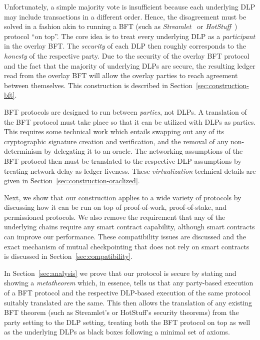 Unfortunately, a simple majority vote is insufficient because each
underlying DLP may include transactions in a different order. Hence,
the disagreement must be solved in a fashion akin to running a BFT
(such as \emph{Streamlet}~\cite{streamlet} or \emph{HotStuff}~\cite{hotstuff})
protocol ``on top''. The core idea is to treat every underlying DLP
as a \emph{participant} in the overlay BFT. The \emph{security} of
each DLP then roughly corresponds to the \emph{honesty} of the
respective party. Due to the security of the overlay BFT protocol
and the fact that the majority of underlying DLPs are secure, the
resulting ledger read from the overlay BFT will allow the overlay
parties to reach agreement between themselves. This construction
is described in Section~\ref{sec:construction-bft}.

BFT protocols are designed to run between \emph{parties}, not DLPs.
A translation of the BFT protocol must take place so that it can be
utilized with DLPs as parties. This requires some technical work
which entails swapping out any of its cryptographic signature creation
and verification, and the removal of any non-determinism by delegating
it to an oracle. The networking assumptions of the BFT protocol then
must be translated to the respective DLP assumptions by treating
network delay as ledger liveness. These \emph{virtualization} technical
details are given in Section~\ref{sec:construction-oraclized}.

Next, we show that our construction applies to a wide variety of
protocols by discussing how it can be run on top of proof-of-work,
proof-of-stake, and permissioned protocols. We also remove the requirement
that any of the underlying chains require any smart contract capability,
although smart contracts can improve our performance. These compatibility
issues are discussed and the exact mechanism of mutual checkpointing
that does not rely on smart contracts is discussed in
Section~\ref{sec:compatibility}.

In Section~\ref{sec:analysis} we prove that our protocol is secure by
stating and showing a \emph{metatheorem} which, in essence, tells us that any
party-based execution of a BFT protocol and the respective DLP-based
execution of the same protocol suitably translated are the same. This
then allows the translation of any existing BFT theorem (such as Streamlet's
or HotStuff's security theorems) from the party setting to the DLP setting,
treating both the BFT protocol on top as well as the underlying DLPs as
black boxes following a minimal set of axioms.
